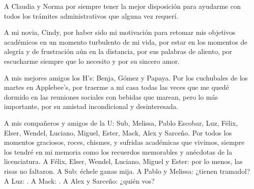 A Claudia y Norma por siempre tener la mejor disposición para ayudarme 
con todos los trámites administrativos que alguna vez requerí. 

A mi novia, Cindy, por haber sido mi motivación para retomar mis 
objetivos académicos en un momento turbulento de mi vida, 
por estar en los momentos de alegría y de frustración aún en la distancia, 
por sus palabras de aliento, por escucharme siempre que lo necesito y 
por su sincero amor.

A mis mejores amigos los H's: Benja, Gómez y Papaya. Por los cuchubales de
los martes en Applebee's, por traerme a mi casa todas las veces que 
me quedé dormido en las reuniones sociales con bebidas que marean, 
pero lo más importante, por su amistad 
incondicional y desinteresada.

A mis compañeros y amigos de la U: Sub, Melissa, Pablo Escobar, 
Luz, Félix, Elser, Wendel, Luciano, Miguel, Ester, Mack, Alex y Sarceño.
Por todos los momentos graciosos, roces, chismes, y sufridas académicas 
que vivimos, siempre los tendré en mi memoria como los recuerdos memorables y 
anécdotas de la licenciatura. A Félix, Elser, Wendel, Luciano, Miguel y Ester: 
por lo menos, las risas no faltaron. A Sub: échele ganas mija. 
A Pablo y Melissa: ¿tienen tramadol? A Luz: . A Mack: . A
Alex y Sarceño: ¿quién vos? 
% 
